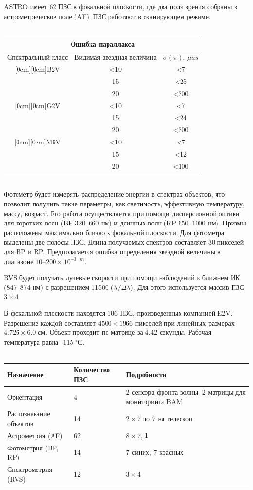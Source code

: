 \documentclass[14pt]{article} %
\begin{document}
ASTRO имеет 62 ПЗС в фокальной плоскости, где два поля зрения собраны в астрометрическое поле (AF). ПЗС работают в сканирующем режиме.\\\\
\begin{tabular}{|c|c|c|}
\hline
\multicolumn{3}{|c|}{Ошибка параллакса}\\
\hline
Спектральный класс & Видимая звездная величина & $\sigma(\pi)$, $\mu as$\\
\hline
\raisebox{-4ex}[0cm][0cm]{B2V} &<10 &<7\\
\cline{2-3}
& 15 & <25\\
\cline{2-3}
& 20 & <300\\
\hline
\raisebox{-4ex}[0cm][0cm]{G2V} &<10 &<7\\
\cline{2-3}
& 15 & <24\\
\cline{2-3}
&20 & <300\\
\hline
\raisebox{-4ex}[0cm][0cm]{M6V} &<10 &<7\\
\cline{2-3}
& 15 & <12\\
\cline{2-3}
&20 & <100\\
\hline
\end{tabular}\\

Фотометр будет измерять распределение энергии в спектрах объектов, что позволит получить такие параметры, как светимость, эффективную температуру, массу, возраст. Его работа осуществляется при помощи дисперсионной оптики для коротких волн (BP 320--660 нм) и длинных волн (RP 650--1000 нм). Призмы расположены максимально близко к фокальной плоскости. Для фотометра выделены две полосы ПЗС. Длина получаемых спектров составляет 30 пикселей для BP и RP. Предполагается ошибка определения звездной величины в диапазоне $10\mbox{--}200\times10^{-3\mbox{ }m}$.

RVS будет получать лучевые скорости при помощи наблюдений в ближнем ИК (847--874 нм) с разрешением 11500 ($\lambda/\Delta\lambda$). Для этого используется массив ПЗС $3\times4$.

В фокальной плоскости находятся 106 ПЗС, произведенных компанией E2V. Разрешение каждой составляет $4500\times1966$ пикселей при линейных размерах $4.726\times6.0$ см. Объект проходит по матрице за 4.42 секунды. Рабочая температура равна -115 $^\circ$С.
\\\\
\begin{tabular}{|p{3.5cm}|p{2.5cm}|p{8cm}|}
\hline
Назначение&Количество ПЗС&Подробности\\
\hline
Ориентация &4 & 2 сенсора фронта волны, 2 матрицы для мониторинга BAM\\
\hline
Распознавание объектов &14&$2\times7$ по 7 на телескоп\\
\hline
Астрометрия (AF) & 62 & $8\times7$, $1\time6$\\
\hline
Фотометрия (BP, RP) & 14 & 7 синих, 7 красных\\
\hline
Спектрометрия (RVS) & 12& $3\times4$\\
\hline
\end{tabular}\\
\end{document}
